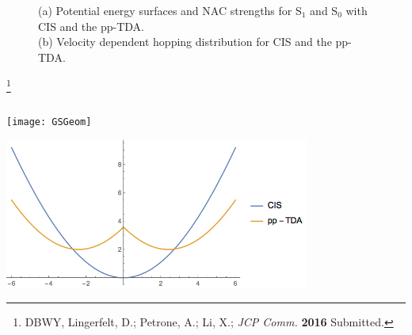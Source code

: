 \documentclass[usepdftitle=false,10pt]{beamer}
\newcommand\blfootnote[1]{%
  \begingroup
  \renewcommand\thefootnote{}\footnote{#1}%
  \addtocounter{footnote}{-1}%
  \endgroup
}
\begin{document}
\begin{frame}
\begin{figure}
\begin{subfigure}[b]{0.40\textwidth}
  \caption{ }
  \label{fig:hops}
  \end{subfigure}
  \vspace{-0.4cm}
  \caption{(a) Potential energy surfaces and NAC strengths for S$_1$ and S$_0$ with CIS
  and the pp-TDA.\\
  (b) Velocity dependent hopping distribution for CIS and the pp-TDA.}
  \end{figure}
  \blfootnote{\tiny DBWY, Lingerfelt, D.; Petrone, A.; Li, X.; \emph{JCP Comm.} \textbf{2016} Submitted.}
\end{frame}

\begin{frame}
\frametitle{}
\hfill  \texttt{[image: GSGeom]}

\includegraphics[width=0.75\textwidth]{ppTDAPES} \hfill
\end{frame}
\end{document}
